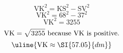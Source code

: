 \[\text{VK}^{2}=\text{KS}^{2}-\text{SV}^{2}\]
\[\text{VK}^{2}=68^{2}-37^{2}\]
\[\text{VK}^{2}=3255\]
\[\text{VK}=\sqrt{\mathstrut 3255}\text{ because VK is positive.}\]
\[\uline{\text{VK}\approx\SI{57.05}{dm}}\]